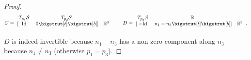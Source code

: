 \documentclass[11pt]{article}
\newcommand{\R}{\mathbb{R}}
\newcommand{\Surf}{\mathcal{S}}
\newcommand{\Id}{\mathrm{Id}}
\newcommand\topstrut[1][1.2ex]{\setlength\bigstrutjot{#1}{\bigstrut[t]}}
\newcommand\botstrut[1][1.2ex]{\setlength\bigstrutjot{#1}{\bigstrut[b]}}
\theoremstyle{plain}
\theoremstyle{definition}
\theoremstyle{remark}
\begin{document}
\begin{proof}
\[
C = 
\begin{blockarray}{ccl}
	\begin{block}{ccl}
		T_{p_1} \Surf & T_{p_2} \Surf & \\
	\end{block}
	\begin{block}{[cc] l}
		\Id & 0 \topstrut \botstrut & \R^3 \\
	\end{block}
\end{blockarray}
\qquad
D = 
\begin{blockarray}{ccl}
	\begin{block}{ccl}
		T_{p_3} \Surf & \R & \\
	\end{block}
	\begin{block}{[cc] l}
		-\Id & n_1 - n_3 \topstrut \botstrut & \R^3 \\
	\end{block}
\end{blockarray}.
\]
$D$ is indeed invertible because $n_1 - n_3$ has a non-zero component along $n_3$ because $n_1 \neq n_3$ (otherwise $p_1 = p_3$). 


\end{proof}
\end{document}

